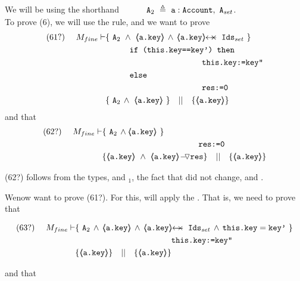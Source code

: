 \begin{proofO}
We will be  using the shorthand 
 $~ \strut \hspace{.9cm}  \mbox{\normalfont{\texttt{A}}}_{2}\ \triangleq \  \mbox{\normalfont{\texttt{a}}}:\mbox{\normalfont{\texttt{Account}}},\  \mbox{\normalfont{\texttt{A}}}_{set}$.\\


To prove (6), we will use the  {} rule, and we want to prove
\\
\begin{align*}
\text{(61?)}  \ \ \ \ M_{fine} \vdash 
		&	\{  \ \Alocalssets\ \wedge\  {\inside{\prg{a.key}}} \, \wedge \, \protectedFrom {\prg{a.key}} {\Idsset} \  \} \\
		& \SPT   \prg{if (this.key==key') then }\\
		& \SPT \SPT   \SPT\SPT  \prg{this.key:=key''} \\
	        & \SPT   \prg{else }\\
		& \SPT\SPT   \SPT\SPT  \prg{res:=0} \\
		& \{ \ \Alocalssets\,\wedge\ {\inside{\prg{a.key}}}\    \} \ \ \  || \ \ \ 
		   \{ {\inside{\prg{a.key}}} \}
\end{align*}
and that
\begin{align*}
\text{(62?)}  \ \ \ \ M_{fine} \vdash
          &  \{ \ \Alocalssets\,\wedge \inside{\prg{a.key}} \  \}  \\
		& \SPT\SPT   \SPT\SPT  \prg{res:=0} \\
		& \{ {\inside{\prg{a.key}}}\ \wedge\ {\PushASLong {\prg{res}} {\inside{\prg{a.key}}}}  \} \ \ \  || \ \ \ 
		   \{ {\inside{\prg{a.key}}} \}
\end{align*}

(62?) follows   from the types, and {}$_1$, the fact that  did not change, and  .

\vspace{.5cm}
Wenow  want to  prove (61?). For this, will apply the {}. That is, we need to prove that

\begin{align*}
\text{(63?)}  \ \ \ \ M_{fine} \vdash 
		&	\{  \ \Alocalssets\,\wedge\, {\inside{\prg{a.key}}} \, \wedge \, \protectedFrom {\prg{a.key}} {\Idsset} \, \wedge  \,  \prg{this.key}=\prg{key'}\  \} \\
		& \SPT \SPT   \SPT\SPT  \prg{this.key:=key''} \\
		& \{ {\inside{\prg{a.key}}}  \} \ \ \  || \ \ \ 
		   \{ {\inside{\prg{a.key}}} \}
\end{align*}
 
and that
 

\end{proofO}
